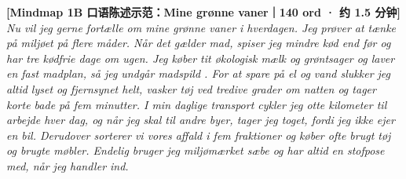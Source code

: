 \begin{transbox}
\small
\textbf{\color{NCDNavy}[Mindmap 1B 口语陈述示范：Mine grønne vaner｜140 ord · 约 1.5 分钟]}\\
\textit{Nu vil jeg gerne fortælle om mine grønne vaner  i hverdagen. Jeg prøver at tænke på miljøet  på flere måder. Når det gælder mad, spiser jeg mindre kød end før og har tre kødfrie dage om ugen. Jeg køber tit økologisk  mælk og grøntsager og laver en fast madplan, så jeg undgår madspild . For at spare på el og vand slukker jeg altid lyset og fjernsynet helt, vasker tøj ved tredive grader om natten og tager korte bade på fem minutter. I min daglige transport cykler jeg otte kilometer til arbejde hver dag, og når jeg skal til andre byer, tager jeg toget, fordi jeg ikke ejer en bil. Derudover sorterer vi vores affald  i fem fraktioner og køber ofte brugt tøj og brugte møbler. Endelig bruger jeg miljømærket sæbe og har altid en stofpose med, når jeg handler ind.}
\end{transbox}

